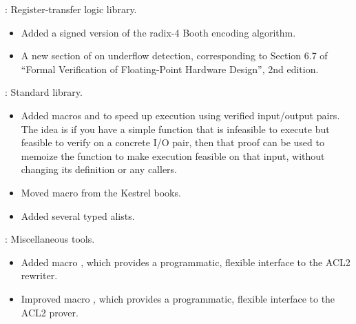 
\begin{frame}

\implibtitle

:
Register-transfer logic library.
\begin{itemize}
\item Added a signed version of the radix-4 Booth encoding algorithm.
\item A new section of  on
      underflow detection, corresponding to Section 6.7 of ``Formal
      Verification of Floating-Point Hardware Design'', 2nd edition.
\end{itemize}

\end{frame}


\begin{frame}

\implibtitle

:
Standard library.
\begin{itemize}
\item Added macros  and 
      to speed up execution using verified input/output pairs.
      The idea is if you have a simple function that is infeasible to
      execute but feasible to verify on a concrete I/O pair,
      then that proof can be used to memoize the function to make execution
      feasible on that input, without changing its definition or any callers.
\item Moved macro  from the Kestrel books.
\item Added several typed alists.
\end{itemize}

\end{frame}


\begin{frame}

\implibtitle

:
Miscellaneous tools.
\begin{itemize}
\item Added macro ,
      which provides a programmatic, flexible interface
      to the ACL2 rewriter.
\item Improved macro ,
      which provides a programmatic, flexible interface
      to the ACL2 prover.
\end{itemize}
\end{frame}



